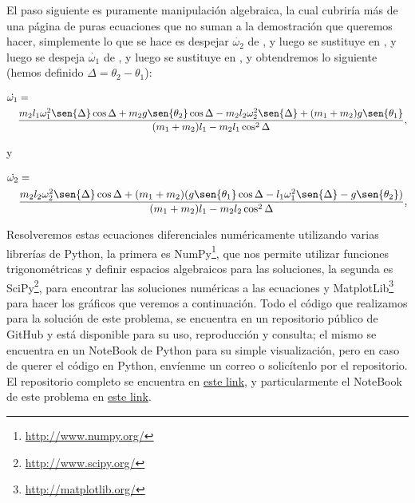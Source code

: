 \documentclass[a4paper,10pt]{article}
\numberwithin{equation}{section}
\begin{document}
El paso siguiente es puramente manipulación algebraica, la cual cubriría más de una 
página de puras ecuaciones que no suman a la demostración que queremos hacer, simplemente
lo que se hace es despejar $\dot{\omega_2}$ de , y luego se sustituye 
en , y luego se despeja $\dot{\omega_1}$ de , y luego se sustituye 
en , y obtendremos lo siguiente (hemos definido $\Delta = \theta_2 - \theta_1$):

\begin{align}
\begin{split}
\dot{\omega_1} &= \\
   &\frac{m_2 l_1 \omega_1^2 \sen{\Delta}\cos{\Delta}
 + m_2 g \sen{\theta_2}\cos{\Delta}-m_2 l_2 \omega_2^2\sen{\Delta} 
 +(m_1 + m_2)g \sen{\theta_1}}{(m_1 + m_2) l_1 - m_2 l_1 \cos^2{\Delta}},
\end{split}
 \end{align}

y

\begin{align}
\begin{split}
\dot{\omega_2} &= \\
   &\frac{m_2 l_2 \omega_2^2 \sen{\Delta}\cos{\Delta}
 + (m_1 + m_2)(g \sen{\theta_1}\cos{\Delta} - l_1 \omega_1^2\sen{\Delta}
 - g\sen{\theta_2})}{(m_1 + m_2) l_1 - m_2 l_2 \cos^2{\Delta}},
\end{split}
 \end{align}

Resolveremos estas ecuaciones diferenciales numéricamente utilizando varias librerías 
de Python, la primera es NumPy\footnote{\href{http://www.numpy.org/}{http://www.numpy.org/}},
que nos permite utilizar funciones trigonométricas y definir espacios algebraicos para 
las soluciones, la segunda es SciPy\footnote{\href{http://www.scipy.org/}{http://www.scipy.org/}},
para encontrar las soluciones numéricas a las ecuaciones y MatplotLib\footnote{
\href{http://matplotlib.org/}{http://matplotlib.org/}} para hacer los gráficos que 
veremos a continuación. Todo el código que realizamos para la solución de este problema,
se encuentra en un repositorio público de GitHub y está disponible para su uso, reproducción
y consulta; el mismo se encuentra en un NoteBook de Python para su simple visualización,
pero en caso de querer el código en Python, envíenme un correo o solicítenlo por el 
repositorio. El repositorio completo se encuentra en \href{https://github.com/FavioVazquez/MecanicaClasica-PCF}{\color{blue} este link},
y particularmente el NoteBook de este problema en \href{https://github.com/FavioVazquez/MecanicaClasica-PCF/blob/master/Tarea4/Problema\%202.ipynb}{\color{blue} este link}.
\end{document}
